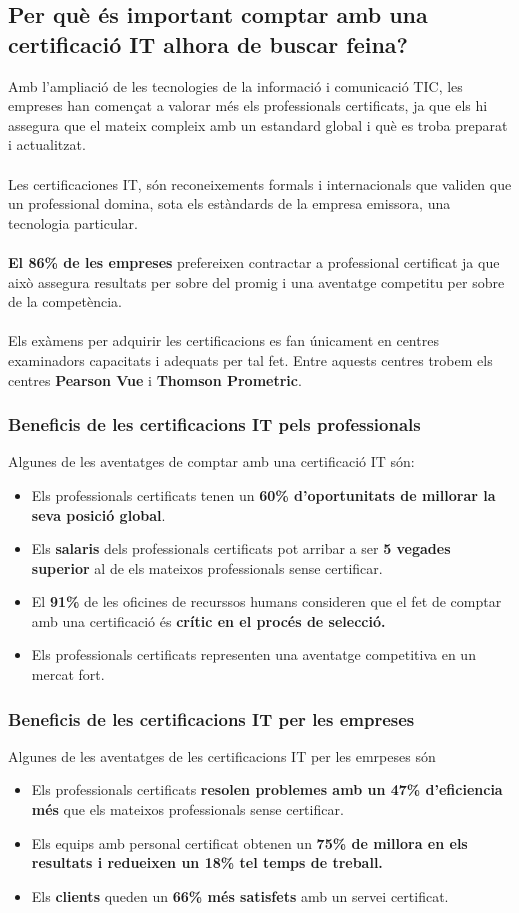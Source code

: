 \documentclass[12pt]{article}
\begin{document}
\subsection{Per què és important comptar amb una certificació IT alhora de buscar feina?}
Amb l'ampliació de les tecnologies de la informació i comunicació TIC, les empreses han començat a valorar més els professionals certificats, ja que els hi assegura que el mateix compleix amb un estandard global i què es troba preparat i actualitzat.
\\\\Les certificaciones IT, són reconeixements formals i internacionals que validen que un professional domina, sota els estàndards de la empresa emissora, una tecnologia particular.
\\\\\textbf{El 86\% de les empreses} prefereixen contractar a professional certificat ja que això assegura resultats per sobre del promig i una aventatge competitu per sobre de la competència.
\\\\Els exàmens per adquirir les certificacions es fan únicament en centres examinadors capacitats i adequats per tal fet. Entre aquests centres trobem els centres \textbf{Pearson Vue} i \textbf{Thomson Prometric}.
\subsubsection{Beneficis de les certificacions IT pels professionals}
Algunes de les aventatges de comptar amb una certificació IT són:
\begin{itemize}
	\item Els professionals certificats tenen un \textbf{60\% d'oportunitats de millorar la seva posició global}.
	\item Els \textbf{salaris} dels professionals certificats pot arribar a ser \textbf{5 vegades superior} al de els mateixos professionals sense certificar.
	\item El \textbf{91\%} de les oficines de recurssos humans consideren que el fet de comptar amb una certificació és \textbf{crític en el procés de selecció.}
	\item Els professionals certificats representen una aventatge competitiva en un mercat fort.
\end{itemize}
\subsubsection{Beneficis de les certificacions IT per les empreses}
Algunes de les aventatges de les certificacions IT per les emrpeses són
\begin{itemize}
	\item Els professionals certificats \textbf{resolen problemes amb un 47\% d'eficiencia més} que els mateixos professionals sense certificar.
	\item Els equips amb personal certificat obtenen un \textbf{75\% de millora en els resultats i redueixen un 18\% tel temps de treball.}
	\item Els \textbf{clients} queden un \textbf{66\% més satisfets} amb un servei certificat.
\end{itemize}
\end{document}
